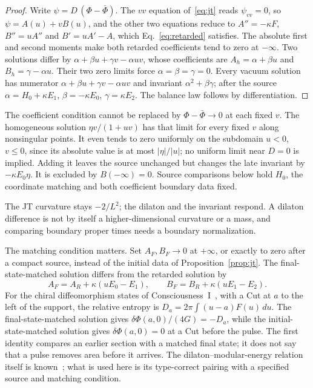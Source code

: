 \documentclass[12pt,a4paper]{article}
\begin{document}
\begin{proof}
Write $\psi=D\,(\Phi-\bar\Phi)$. The $vv$ equation of~\eqref{eq:jt} reads $\psi_{vv}=0$, so $\psi=A(u)+vB(u)$, and the other two equations reduce to $A''=-\kappa F$, $B''=uA''$ and $B'=uA'-A$, which Eq.~\eqref{eq:retarded} satisfies. The absolute first and second moments make both retarded coefficients tend to zero at $-\infty$. Two solutions differ by $\alpha+\beta u+\gamma v-\alpha uv$, whose coefficients are $A_h=\alpha+\beta u$ and $B_h=\gamma-\alpha u$. Their two zero limits force $\alpha=\beta=\gamma=0$. Every vacuum solution has numerator $\alpha+\beta u+\gamma v-\alpha uv$ and invariant $\alpha^2+\beta\gamma$; after the source $\alpha=H_0+\kappa E_1$, $\beta=-\kappa E_0$, $\gamma=\kappa E_2$. The balance law follows by differentiation. 
\end{proof}

The coefficient condition cannot be replaced by $\Phi-\bar\Phi\to0$ at each fixed $v$. The homogeneous solution $\eta v/(1+uv)$ has that limit for every fixed $v$ along nonsingular points. It even tends to zero uniformly on the subdomain $u<0$, $v\le0$, since its absolute value is at most $|\eta|/|u|$; no uniform limit near $D=0$ is implied. Adding it leaves the source unchanged but changes the late invariant by $-\kappa E_0\eta$. It is excluded by $B(-\infty)=0$. Source comparisons below hold $H_0$, the coordinate matching and both coefficient boundary data fixed.

The JT curvature stays $-2/L^2$; the dilaton and the invariant respond. A dilaton difference is not by itself a higher-dimensional curvature or a mass, and comparing boundary proper times needs a boundary normalization.

The matching condition matters. Set $A_F,B_F\to0$ at $+\infty$, or exactly to zero after a compact source, instead of the initial data of Proposition~\ref{prop:jt}. The final-state-matched solution differs from the retarded solution by
\[
A_F=A_R+\kappa(uE_0-E_1),\qquad
B_F=B_R+\kappa(uE_1-E_2).
\]
For the chiral diffeomorphism states of Consciousness~I~\cite{PaperCI}, with a Cut at $a$ to the left of the support, the relative entropy is $D_a=2\pi\int(u-a)F(u)\,du$. The final-state-matched solution gives $\delta\Phi(a,0)/(4G)=-D_a$, while the initial-state-matched solution gives $\delta\Phi(a,0)=0$ at a Cut before the pulse. The first identity compares an earlier section with a matched final state; it does not say that a pulse removes area before it arrives. The dilaton--modular-energy relation itself is known~\cite{Callebaut2019}; what is used here is its type-correct pairing with a specified source and matching condition.
\end{document}
